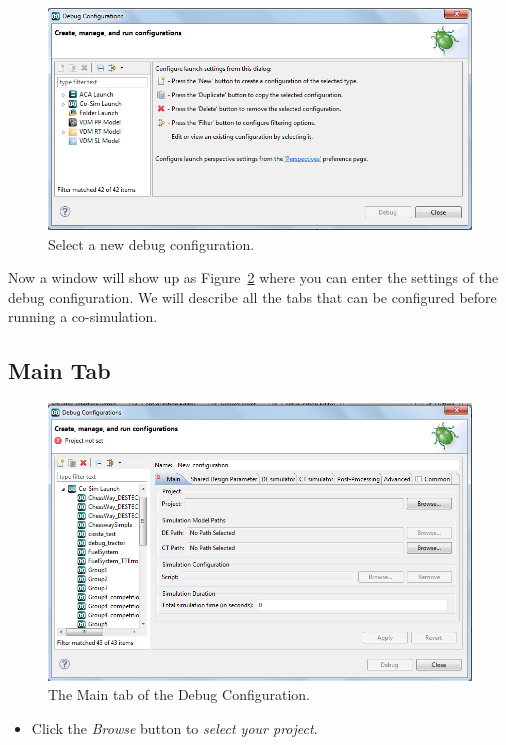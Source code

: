 \documentclass{crescendorepchap}
\begin{document}
\begin{figure}[htbp]
\centering
\includegraphics[width=.8\textwidth]{images/DestecsDebugConfigurationNew.png}
\caption{Select a new debug configuration.\label{fig:DestecsDebugConfigurationNew}}
\end{figure}

Now a window will show up as Figure~\ref{fig:DestecsDebugConfigurationMain}
where you can enter the settings of the debug
configuration. We will describe all the tabs that can be configured before running a
co-simulation.

\subsection{Main Tab}

\begin{figure}[htbp]
\centering
\includegraphics[width=.8\textwidth]{images/DestecsDebugConfigurationMain.png}
\caption{The Main tab of the Debug Configuration.\label{fig:DestecsDebugConfigurationMain}}
\end{figure}

\begin{itemize}
\item
  Click the \emph{Browse} button to \emph{select your project}.
\end{itemize}
\end{document}
